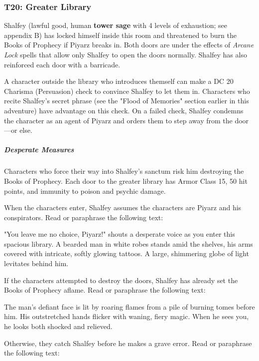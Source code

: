 \documentclass[10pt,a4paper,twoside,bg=print,twocolumn,openany,nodeprecatedcode]{dndbook}
\begin{document}
\subsubsection{T20: Greater Library}
Shalfey (lawful good, human \textbf{tower sage} with 4 levels of exhaustion; see appendix B) has locked himself inside this room and threatened to burn the Books of Prophecy if Piyarz breaks in. Both doors are under the effects of \textit{Arcane Lock} spells that allow only Shalfey to open the doors normally. Shalfey has also reinforced each door with a barricade.

A character outside the library who introduces themself can make a DC 20 Charisma (Persuasion) check to convince Shalfey to let them in. Characters who recite Shalfey's secret phrase (see the "Flood of Memories" section earlier in this adventure) have advantage on this check. On a failed check, Shalfey condemns the character as an agent of Piyarz and orders them to step away from the door—or else.

\subparagraph{Desperate Measures}
Characters who force their way into Shalfey's sanctum risk him destroying the Books of Prophecy. Each door to the greater library has Armor Class 15, 50 hit points, and immunity to poison and psychic damage.

When the characters enter, Shalfey assumes the characters are Piyarz and his conspirators. Read or paraphrase the following text:

\begin{DndReadAloud}{}
"You leave me no choice, Piyarz!" shouts a desperate voice as you enter this spacious library. A bearded man in white robes stands amid the shelves, his arms covered with intricate, softly glowing tattoos. A large, shimmering globe of light levitates behind him.

\end{DndReadAloud}

If the characters attempted to destroy the doors, Shalfey has already set the Books of Prophecy aflame. Read or paraphrase the following text:

\begin{DndReadAloud}{}
The man's defiant face is lit by roaring flames from a pile of burning tomes before him. His outstretched hands flicker with waning, fiery magic. When he sees you, he looks both shocked and relieved.

\end{DndReadAloud}

Otherwise, they catch Shalfey before he makes a grave error. Read or paraphrase the following text:
\end{document}
